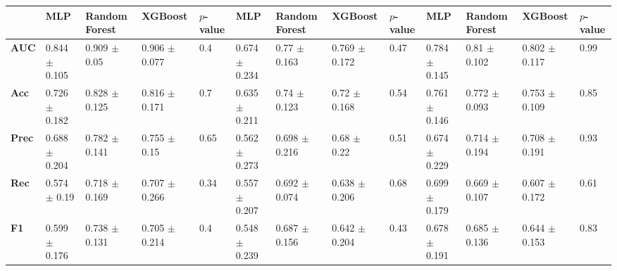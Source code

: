 \begin{tabular}{lllllllllllll}
\toprule
 & MLP & Random Forest & XGBoost & $p$-value & MLP & Random Forest & XGBoost & $p$-value & MLP & Random Forest & XGBoost & $p$-value \\
\midrule
\textbf{AUC} & 0.844 $\pm$ 0.105 & 0.909 $\pm$ 0.05 & 0.906 $\pm$ 0.077 & 0.4 & 0.674 $\pm$ 0.234 & 0.77 $\pm$ 0.163 & 0.769 $\pm$ 0.172 & 0.47 & 0.784 $\pm$ 0.145 & 0.81 $\pm$ 0.102 & 0.802 $\pm$ 0.117 & 0.99 \\
\textbf{Acc} & 0.726 $\pm$ 0.182 & 0.828 $\pm$ 0.125 & 0.816 $\pm$ 0.171 & 0.7 & 0.635 $\pm$ 0.211 & 0.74 $\pm$ 0.123 & 0.72 $\pm$ 0.168 & 0.54 & 0.761 $\pm$ 0.146 & 0.772 $\pm$ 0.093 & 0.753 $\pm$ 0.109 & 0.85 \\
\textbf{Prec} & 0.688 $\pm$ 0.204 & 0.782 $\pm$ 0.141 & 0.755 $\pm$ 0.15 & 0.65 & 0.562 $\pm$ 0.273 & 0.698 $\pm$ 0.216 & 0.68 $\pm$ 0.22 & 0.51 & 0.674 $\pm$ 0.229 & 0.714 $\pm$ 0.194 & 0.708 $\pm$ 0.191 & 0.93 \\
\textbf{Rec} & 0.574 $\pm$ 0.19 & 0.718 $\pm$ 0.169 & 0.707 $\pm$ 0.266 & 0.34 & 0.557 $\pm$ 0.207 & 0.692 $\pm$ 0.074 & 0.638 $\pm$ 0.206 & 0.68 & 0.699 $\pm$ 0.179 & 0.669 $\pm$ 0.107 & 0.607 $\pm$ 0.172 & 0.61 \\
\textbf{F1} & 0.599 $\pm$ 0.176 & 0.738 $\pm$ 0.131 & 0.705 $\pm$ 0.214 & 0.4 & 0.548 $\pm$ 0.239 & 0.687 $\pm$ 0.156 & 0.642 $\pm$ 0.204 & 0.43 & 0.678 $\pm$ 0.191 & 0.685 $\pm$ 0.136 & 0.644 $\pm$ 0.153 & 0.83 \\
\bottomrule
\end{tabular}
